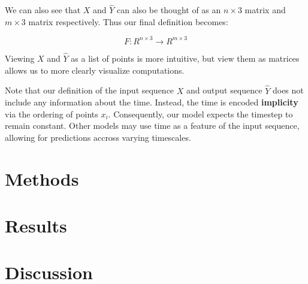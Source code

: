 \documentclass{article}
\begin{document}
We can also see that $X$ and $\hat{Y}$ can also be thought of as an $n \times 3$
matrix and $m \times 3$ matrix respectively. Thus our final definition becomes:

$$ F: R^{n \times 3} \to R^{m \times 3} $$

Viewing $X$ and $\hat{Y}$ as a list of points is more intuitive, but view them as 
matrices allows us to more clearly visualize computations.

Note that our definition of the input sequence $X$ and output sequence $\hat{Y}$ does 
not include any information about the time. Instead, the time is encoded
\textbf{implicity} via the ordering of points $x_i$. Consequently, our model
expects the timestep to remain constant. Other models may use time as a feature
of the input sequence, allowing for predictions accross varying timescales.


\section{Methods}
\section{Results}
\section{Discussion}
\end{document}
